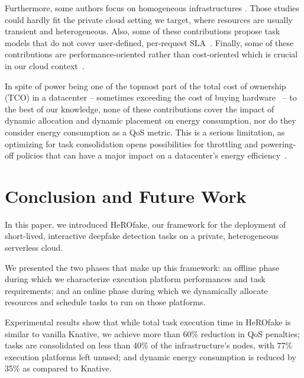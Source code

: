 Furthermore, some authors focus on homogeneous infrastructures \cite{gujaratiSwayamDistributedAutoscaling2017, sureshENSUREEfficientScheduling2020, mampageDeadlineawareDynamicResource2021, singhviAtollScalableLowLatency2021, yangINFlessNativeServerless2022}. Those studies could hardly fit the private cloud setting we target, where resources are usually transient and heterogeneous. Also, some of these contributions propose task models that do not cover user-defined, per-request SLA~\cite{sureshENSUREEfficientScheduling2020, lingPigeonDynamicEfficient2019}. Finally, some of these contributions are performance-oriented rather than cost-oriented which is crucial in our cloud context~\cite{gujaratiSwayamDistributedAutoscaling2017, lingPigeonDynamicEfficient2019, singhviAtollScalableLowLatency2021, choSLADrivenMLInference}.

In spite of power being one of the topmost part of the total cost of ownership (TCO) in a datacenter -- sometimes exceeding the cost of buying hardware~\cite{7279063} -- to the best of our knowledge, none of these contributions cover the impact of dynamic allocation and dynamic placement on energy consumption, nor do they consider energy consumption as a QoS metric. This is a serious limitation, as optimizing for task consolidation opens possibilities for throttling and powering-off policies that can have a major impact on a datacenter's energy efficiency~\cite{chaurasiaComprehensiveSurveyEnergyaware2021}.

\section{Conclusion and Future Work}

In this paper, we introduced HeROfake, our framework for the deployment of short-lived, interactive deepfake detection tasks on a private, heterogeneous serverless cloud.

We presented the two phases that make up this framework: an offline phase during which we characterize execution platform performances and task requirements; and an online phase during which we dynamically allocate resources and schedule tasks to run on those platforms.

Experimental results show that while total task execution time in HeROfake is similar to vanilla Knative, we achieve more than 60\% reduction in QoS penalties; tasks are consolidated on less than 40\% of the infrastructure's nodes, with 77\% execution platforms left unused; and dynamic energy consumption is reduced by 35\% as compared to Knative.

